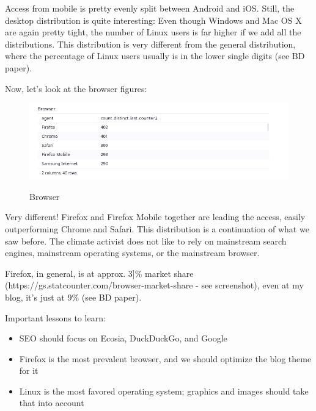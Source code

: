 Access from mobile is pretty evenly split between Android and iOS. Still, the desktop distribution is quite interesting: Even though Windows and Mac OS X are again pretty tight, the number of Linux users is far higher if we add all the distributions. This distribution is very different from the general distribution, where the percentage of Linux users usually is in the lower single digits (see BD paper).

Now, let's look at the browser figures:

\begin{figure}[H]
\centering
\caption {Browser}
\includegraphics[width=\linewidth]{images/figure09.png}
\label{fig:browser}
\end{figure}

Very different! Firefox and Firefox Mobile together are leading the access, easily outperforming Chrome and Safari. This distribution is a continuation of what we saw before. The climate activist does not like to rely on mainstream search engines, mainstream operating systems, or the mainstream browser.

Firefox, in general, is at approx. 3]\% market share (https://gs.statcounter.com/browser-market-share - see screenshot), even at my blog, it's just at 9\% (see BD paper).

Important lessons to learn:

\begin{itemize}
 \item SEO should focus on Ecosia, DuckDuckGo, and Google
 \item Firefox is the most prevalent browser, and we should optimize the blog theme for it
 \item Linux is the most favored operating system; graphics and images should take that into account
\end{itemize}
